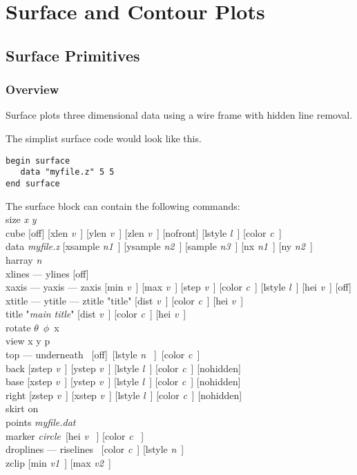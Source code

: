 \chapter{Surface and Contour Plots}
\label{surf:chap}

\section{Surface Primitives}

\subsection{Overview}

Surface plots three dimensional data using a wire frame with hidden line removal.

The simplist surface code would look like this.
\preglecode{}
\begin{Verbatim}
begin surface
   data "myfile.z" 5 5
end surface
\end{Verbatim}
\postglecode{}

The surface block can contain the following commands:\\
{\sf size {\it x }  {\it y }}\\	
{\sf cube [off]  [xlen {\it v}\ ] [ylen {\it v}\ ] [zlen {\it v}\ ] [nofront]  [lstyle {\it l\ }]  [color {\it c\ }]  }\\	
{\sf data {\it myfile.z}  [xsample {\it n1}\ ] [ysample {\it n2}\ ] [sample {\it n3}\ ]  [nx {\it n1}\ ] [ny {\it n2}\ ] }\\
{\sf harray {\it n} \ }\\
{\sf xlines ---  ylines [off]}\\
{\sf xaxis  --- yaxis --- zaxis [min {\it v}\ ]  [max {\it v}\ ]  [step {\it v}\ ]  [color {\it c}\ ] [lstyle {\it l}\ ] [hei {\it v}\ ] [off] }\\
{\sf xtitle ---	ytitle --- ztitle "{\sf title}"  [dist {\it v}\ ] [color {\it c}\ ] [hei {\it v}\ ] }\\
{\sf title "{\it main title}"  [dist {\it v}\ ] [color {\it c}\ ] [hei {\it v}\ ] }\\
{\sf rotate $\theta$\  $\phi$\  x}\\
{\sf view x y p}\\
{\sf top --- underneath \  [off]\ [lstyle {\it n} \ ]\ [color {\it c}\ ]}\\
{\sf back [zstep {\it v}\ ] [ystep {\it v}\ ] [lstyle {\it l}\ ] [color {\it c}\ ] [nohidden] }\\
{\sf base [xstep {\it v}\ ] [ystep {\it v}\ ] [lstyle {\it l}\ ] [color {\it c}\ ] [nohidden] }\\
{\sf right [zstep {\it v}\ ] [xstep {\it v}\ ] [lstyle {\it l}\ ] [color {\it c}\ ] [nohidden] }\\
{\sf skirt on}\\
{\sf points {\it myfile.dat} }\\
{\sf marker {\it circle}\  [hei {\it v} \ ] [color {\it c} \ ] }\\
{\sf droplines --- riselines \ [color {\it c}\ ] [lstyle {\it n}\ ]}\\
{\sf zclip [min {\it v1}\ ]  [max {\it v2}\ ]}\\
%
%

